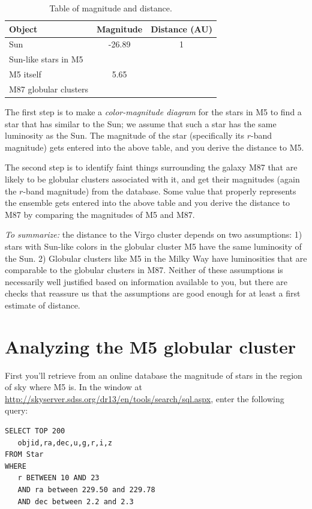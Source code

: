 \begin{table}
	\centering
	\begin{tabular}{l|c|c}
		\toprule
		\textbf{Object} & \textbf{Magnitude} & \textbf{Distance (AU)} \\ \midrule
		Sun & -26.89 & 1 \\\midrule
		Sun-like stars in M5 &  & \\\midrule
		M5 itself & 5.65 & \\\midrule
		M87 globular clusters & &
		\\ \bottomrule
	\end{tabular}
	\caption{Table of magnitude and distance.}\label{gc:tab:mag}
\end{table}

The first step is to make a \textit{color-magnitude diagram} for the stars in M5 to find a star that
has similar to the Sun; we assume that such a star has the same luminosity as the Sun. The
magnitude of the star (specifically its $r$-band magnitude) gets entered into the above table,
and you derive the distance to M5.

The second step is to identify faint things surrounding the galaxy M87 that are likely to be
globular clusters associated with it, and get their magnitudes (again the $r$-band magnitude)
from the database. Some value that properly represents the ensemble gets entered into the
above table and you derive the distance to M87 by comparing the magnitudes of M5 and M87.

\textit{To summarize:} the distance to the Virgo cluster depends on two assumptions: 1) stars
with Sun-like colors in the globular cluster M5 have the same luminosity of the Sun. 2)
Globular clusters like M5 in the Milky Way have luminosities that are comparable to
the globular clusters in M87. Neither of these assumptions is necessarily well justified based on information available to you, but there are checks that reassure us that the assumptions
are good enough for at least a first estimate of distance.

\section{Analyzing the M5 globular cluster}

First you'll retrieve from an online database the magnitude of stars in the region of sky where M5 is. In the window at \url{http://skyserver.sdss.org/dr13/en/tools/search/sql.aspx}, enter the following query:

\begin{verbatim}
SELECT TOP 200
   objid,ra,dec,u,g,r,i,z
FROM Star
WHERE
   r BETWEEN 10 AND 23
   AND ra between 229.50 and 229.78
   AND dec between 2.2 and 2.3
\end{verbatim}

